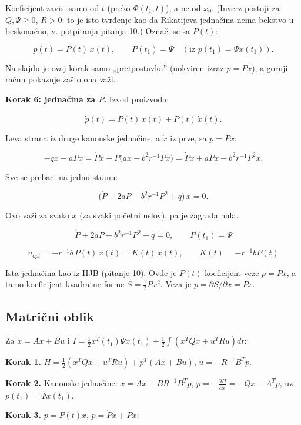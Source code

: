 \documentclass[11pt,a4paper,parskip=half,headsepline,numbers=noenddot]{scrartcl}
\begin{document}
Koeficijent zavisi samo od \(t\) (preko \(\Phi(t_1, t)\)), a ne od \(x_0\). (Inverz postoji za \(Q, \Psi \ge 0\), \(R > 0\): to je isto tvrđenje kao da Rikatijeva jednačina nema bekstvo u beskonačno, v. potpitanja pitanja 10.) Označi se sa \(P(t)\):

\[p(t) = P(t)\,x(t), \qquad P(t_1) = \Psi \quad(\text{iz } p(t_1) = \Psi x(t_1)) .\]

Na slajdu je ovaj korak samo „pretpostavka'' (uokviren izraz \(p = Px\)), a gornji račun pokazuje zašto ona važi.

\textbf{Korak 6: jednačina za \(P\).} Izvod proizvoda:

\[\dot p(t) = \dot P(t)\,x(t) + P(t)\,\dot x(t) .\]

Leva strana iz druge kanonske jednačine, a \(\dot x\) iz prve, sa \(p = Px\):

\[-qx - aPx = \dot Px + P\big(ax - b^2r^{-1}Px\big) = \dot Px + aPx - b^2r^{-1}P^2x .\]

Sve se prebaci na jednu stranu:

\[\big(\dot P + 2aP - b^2r^{-1}P^2 + q\big)\,x = 0 .\]

Ovo važi za svako \(x\) (za svaki početni uslov), pa je zagrada nula.

\begin{kljucna}
\[\dot P + 2aP - b^2r^{-1}P^2 + q = 0, \qquad P(t_1) = \Psi\]

\[u_{opt} = -r^{-1}b\,P(t)\,x(t) = K(t)\,x(t), \qquad K(t) = -r^{-1}bP(t)\]

Ista jednačina kao iz HJB (pitanje 10). Ovde je \(P(t)\) koeficijent veze \(p = Px\), a tamo koeficijent kvadratne forme \(S = \frac12Px^2\). Veza je \(p = \partial S/\partial x = Px\).
\end{kljucna}

\subsection{Matrični oblik}

Za \(\dot x = Ax + Bu\) i \(I = \frac12x^T(t_1)\Psi x(t_1) + \frac12\int(x^TQx + u^TRu)dt\):

\textbf{Korak 1.} \(H = \frac12(x^TQx + u^TRu) + p^T(Ax + Bu)\), \(u = -R^{-1}B^Tp\).

\textbf{Korak 2.} Kanonske jednačine: \(\dot x = Ax - BR^{-1}B^Tp\), \(\dot p = -\frac{\partial H}{\partial x} = -Qx - A^Tp\), uz \(p(t_1) = \Psi x(t_1)\).

\textbf{Korak 3.} \(p = P(t)x\), \(\dot p = \dot Px + P\dot x\):
\end{document}
